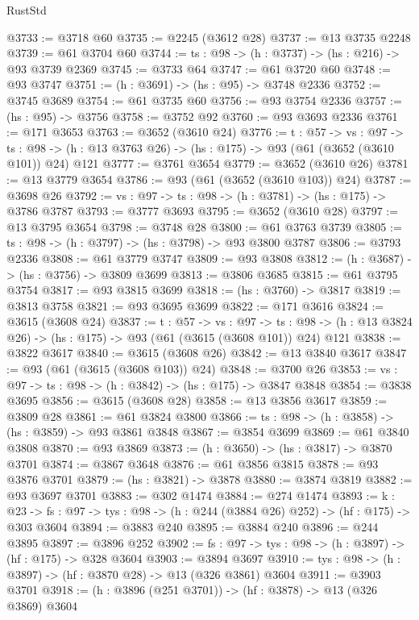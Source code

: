 \begin{lexlean}{RustStd}
\begin{coremodule}
{\begin{coremodule}
{{{{{{{{{{{{{@3733 := @3718 @60
@3735 := @2245 (@3612 @28)
@3737 := @13 @3735 @2248
@3739 := @61 @3704 @60
@3744 := {ts : @98} -> (h : @3737) -> (hs : @216) -> @93 @3739 @2369
@3745 := @3733 @64
@3747 := @61 @3720 @60
@3748 := @93 @3747
@3751 := (h : @3691) -> (hs : @95) -> @3748 @2336
@3752 := @3745 @3689
@3754 := @61 @3735 @60
@3756 := @93 @3754 @2336
@3757 := (hs : @95) -> @3756
@3758 := @3752 @92
@3760 := @93 @3693 @2336
@3761 := @171 @3653
@3763 := @3652 (@3610 @24)
@3776 := {t : @57} ->
  {vs : @97} ->
  {ts : @98} -> (h : @13 @3763 @26) -> (hs : @175) -> @93 (@61 (@3652 (@3610 @101)) @24) @121
@3777 := @3761 @3654
@3779 := @3652 (@3610 @26)
@3781 := @13 @3779 @3654
@3786 := @93 (@61 (@3652 (@3610 @103)) @24)
@3787 := @3698 @26
@3792 := {vs : @97} -> {ts : @98} -> (h : @3781) -> (hs : @175) -> @3786 @3787
@3793 := @3777 @3693
@3795 := @3652 (@3610 @28)
@3797 := @13 @3795 @3654
@3798 := @3748 @28
@3800 := @61 @3763 @3739
@3805 := {ts : @98} -> (h : @3797) -> (hs : @3798) -> @93 @3800 @3787
@3806 := @3793 @2336
@3808 := @61 @3779 @3747
@3809 := @93 @3808
@3812 := (h : @3687) -> (hs : @3756) -> @3809 @3699
@3813 := @3806 @3685
@3815 := @61 @3795 @3754
@3817 := @93 @3815 @3699
@3818 := (hs : @3760) -> @3817
@3819 := @3813 @3758
@3821 := @93 @3695 @3699
@3822 := @171 @3616
@3824 := @3615 (@3608 @24)
@3837 := {t : @57} ->
  {vs : @97} ->
  {ts : @98} -> (h : @13 @3824 @26) -> (hs : @175) -> @93 (@61 (@3615 (@3608 @101)) @24) @121
@3838 := @3822 @3617
@3840 := @3615 (@3608 @26)
@3842 := @13 @3840 @3617
@3847 := @93 (@61 (@3615 (@3608 @103)) @24)
@3848 := @3700 @26
@3853 := {vs : @97} -> {ts : @98} -> (h : @3842) -> (hs : @175) -> @3847 @3848
@3854 := @3838 @3695
@3856 := @3615 (@3608 @28)
@3858 := @13 @3856 @3617
@3859 := @3809 @28
@3861 := @61 @3824 @3800
@3866 := {ts : @98} -> (h : @3858) -> (hs : @3859) -> @93 @3861 @3848
@3867 := @3854 @3699
@3869 := @61 @3840 @3808
@3870 := @93 @3869
@3873 := (h : @3650) -> (hs : @3817) -> @3870 @3701
@3874 := @3867 @3648
@3876 := @61 @3856 @3815
@3878 := @93 @3876 @3701
@3879 := (hs : @3821) -> @3878
@3880 := @3874 @3819
@3882 := @93 @3697 @3701
@3883 := @302 @1474
@3884 := @274 @1474
@3893 := {k : @23} ->
  {fs : @97} -> {tys : @98} -> (h : @244 (@3884 @26) @252) -> (hf : @175) -> @303 @3604
@3894 := @3883 @240
@3895 := @3884 @240
@3896 := @244 @3895
@3897 := @3896 @252
@3902 := {fs : @97} -> {tys : @98} -> (h : @3897) -> (hf : @175) -> @328 @3604
@3903 := @3894 @3697
@3910 := {tys : @98} -> (h : @3897) -> (hf : @3870 @28) -> @13 (@326 @3861) @3604
@3911 := @3903 @3701
@3918 := (h : @3896 (@251 @3701)) -> (hf : @3878) -> @13 (@326 @3869) @3604
}}}}}}}}}}}}}
\end{coremodule}}
\end{coremodule}
\end{lexlean}
